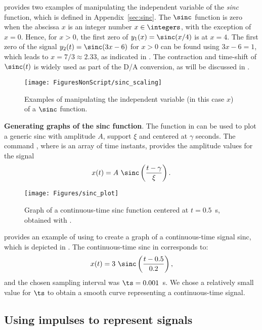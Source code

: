  provides two examples of manipulating the independent variable of the \emph{sinc} function, which is defined in Appendix~\ref{sec:sinc}. The $\sinc$ function is zero when the abscissa $x$ is an integer number $x \in \integers$, with the exception of $x=0$. Hence, for $x > 0$, the first zero of $y_1(x)=\sinc(x/4)$ is at $x=4$.
The first zero of the signal $y_2(t)=\sinc(3x-6)$ for $x>0$ can be found using $3x -6 =1$, which leads to $x=7/3 \approx 2.33$, as indicated in . The contraction and time-shift of $\sinc(t)$ is widely used as part of the D/A conversion, as will be discussed in .

\begin{figure}
	\centering
		\texttt{[image: FiguresNonScript/sinc\_scaling]}
	\caption{Examples of manipulating the independent variable (in this case $x$) of a $\sinc$ function.\label{fig:sinc_scaling}}
\end{figure}

\bExample \textbf{Generating graphs of the sinc function}.
The function  in {\matlab} can be used to plot a generic sinc with amplitude $A$, support $\xi$ and centered at $\gamma$ seconds. The command , where  is an array of time instants, provides the amplitude values for the signal
\[
x(t) = A \textrm{~} \sinc \left( \frac{t-\gamma}{\xi} \right).
\]


\begin{figure}
	\centering
		\texttt{[image: Figures/sinc\_plot]}		
	\caption{Graph of a continuous-time sinc function centered at $t=0.5$~s, obtained with .\label{fig:sinc_plot}}
\end{figure}

 provides an example of using  to create a graph of a continuous-time signal sinc, which is depicted in . The continuous-time sinc in  corresponds to:
\[
x(t) = 3 \textrm{~} \sinc \left( \frac{t-0.5}{0.2} \right),
\]
and the chosen sampling interval was $\ts=0.001$~s. We chose a relatively small value for $\ts$ to obtain a smooth curve representing a continuous-time signal.
\eExample

\subsection{Using impulses to represent signals}
\label{sec:impulses_to_represent_signals}

